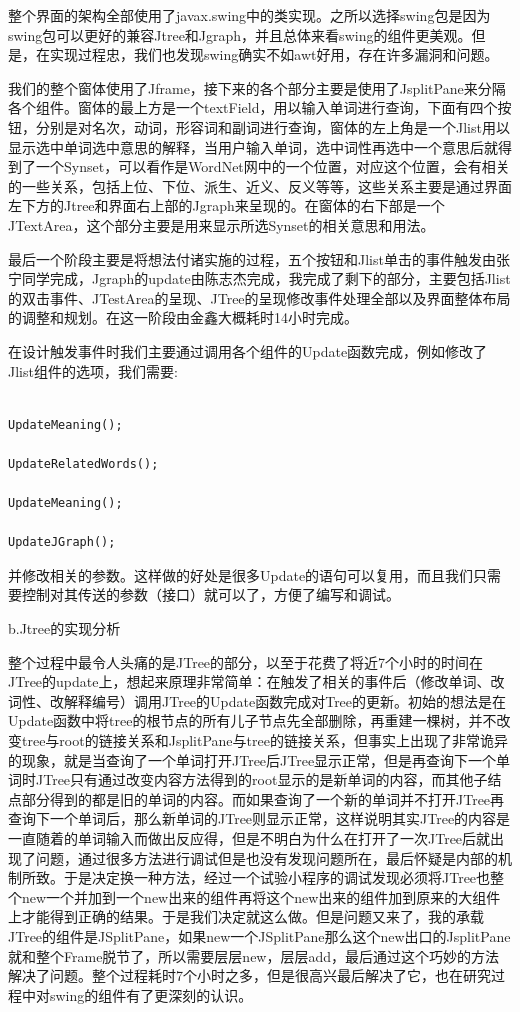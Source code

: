 \documentclass[a4paper,unicode=true,xetex]{article}
\begin{document}
整个界面的架构全部使用了javax.swing中的类实现。之所以选择swing包是因为swing包可以更好的兼容Jtree和Jgraph，并且总体来看swing的组件更美观。但是，在实现过程忠，我们也发现swing确实不如awt好用，存在许多漏洞和问题。

我们的整个窗体使用了Jframe，接下来的各个部分主要是使用了JsplitPane来分隔各个组件。窗体的最上方是一个textField，用以输入单词进行查询，下面有四个按钮，分别是对名次，动词，形容词和副词进行查询，窗体的左上角是一个Jlist用以显示选中单词选中意思的解释，当用户输入单词，选中词性再选中一个意思后就得到了一个Synset，可以看作是WordNet网中的一个位置，对应这个位置，会有相关的一些关系，包括上位、下位、派生、近义、反义等等，这些关系主要是通过界面左下方的Jtree和界面右上部的Jgraph来呈现的。在窗体的右下部是一个JTextArea，这个部分主要是用来显示所选Synset的相关意思和用法。

最后一个阶段主要是将想法付诸实施的过程，五个按钮和Jlist单击的事件触发由张宁同学完成，Jgraph的update由陈志杰完成，我完成了剩下的部分，主要包括Jlist的双击事件、JTestArea的呈现、JTree的呈现修改事件处理全部以及界面整体布局的调整和规划。在这一阶段由金鑫大概耗时14小时完成。

在设计触发事件时我们主要通过调用各个组件的Update函数完成，例如修改了Jlist组件的选项，我们需要:
\begin{lstlisting}

UpdateMeaning();

UpdateRelatedWords();

UpdateMeaning();

UpdateJGraph();
\end{lstlisting}
并修改相关的参数。这样做的好处是很多Update的语句可以复用，而且我们只需要控制对其传送的参数（接口）就可以了，方便了编写和调试。

b.Jtree的实现分析

整个过程中最令人头痛的是JTree的部分，以至于花费了将近7个小时的时间在JTree的update上，想起来原理非常简单：在触发了相关的事件后（修改单词、改词性、改解释编号）调用JTree的Update函数完成对Tree的更新。初始的想法是在Update函数中将tree的根节点的所有儿子节点先全部删除，再重建一棵树，并不改变tree与root的链接关系和JsplitPane与tree的链接关系，但事实上出现了非常诡异的现象，就是当查询了一个单词打开JTree后JTree显示正常，但是再查询下一个单词时JTree只有通过改变内容方法得到的root显示的是新单词的内容，而其他子结点部分得到的都是旧的单词的内容。而如果查询了一个新的单词并不打开JTree再查询下一个单词后，那么新单词的JTree则显示正常，这样说明其实JTree的内容是一直随着的单词输入而做出反应得，但是不明白为什么在打开了一次JTree后就出现了问题，通过很多方法进行调试但是也没有发现问题所在，最后怀疑是内部的机制所致。于是决定换一种方法，经过一个试验小程序的调试发现必须将JTree也整个new一个并加到一个new出来的组件再将这个new出来的组件加到原来的大组件上才能得到正确的结果。于是我们决定就这么做。但是问题又来了，我的承载JTree的组件是JSplitPane，如果new一个JSplitPane那么这个new出口的JsplitPane就和整个Frame脱节了，所以需要层层new，层层add，最后通过这个巧妙的方法解决了问题。整个过程耗时7个小时之多，但是很高兴最后解决了它，也在研究过程中对swing的组件有了更深刻的认识。
\end{document}
